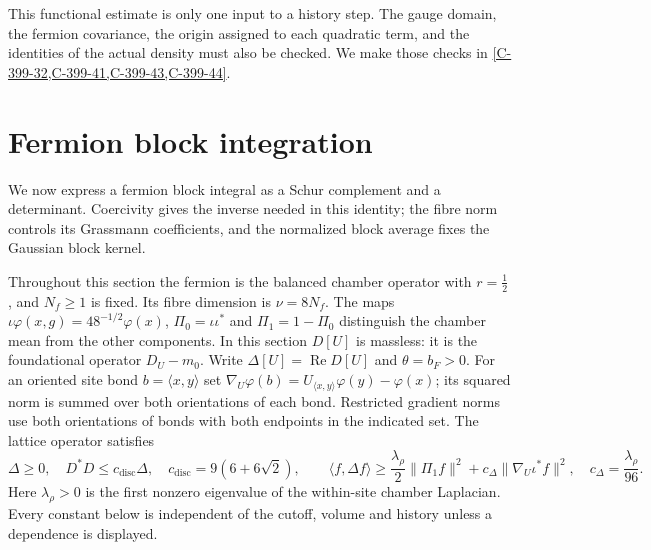 \documentclass[11pt,letterpaper,reqno]{amsart}
\theoremstyle{definition}
\theoremstyle{remark}
\begin{document}
This functional estimate is only one input to a history step.
The gauge domain, the fermion covariance, the origin assigned
to each quadratic term, and the identities of the actual density
must also be checked. We make those checks in
\cref{C-399-32,C-399-41,C-399-43,C-399-44}.

\section{Fermion block integration}

We now express a fermion block integral as a Schur complement
and a determinant. Coercivity gives the inverse needed in this
identity; the fibre norm controls its Grassmann coefficients,
and the normalized block average fixes the Gaussian block kernel.

Throughout this section the fermion is the balanced chamber operator
with $r=\frac12$, and $N_f\ge1$ is fixed.  Its fibre dimension is
$\nu=8N_f$.  The maps $\iota\varphi(x,g)=48^{-1/2}\varphi(x)$,
$\Pi_0=\iota\iota^*$ and $\Pi_1=1-\Pi_0$ distinguish the chamber mean
from the other components.  In this section $D[U]$ is massless:
it is the foundational operator $D_U-m_0$.
Write $\Delta[U]=\operatorname{Re}D[U]$ and $\theta=b_F>0$.
For an oriented site bond $b=\langle x,y\rangle$ set
$\nabla_U\varphi(b)=U_{\langle x,y\rangle}\varphi(y)-\varphi(x)$;
its squared norm is summed over both orientations of each bond.
Restricted gradient norms use both orientations of bonds with both
endpoints in the indicated set.
The lattice operator satisfies
\[
 \Delta\ge0,\quad D^*D\le c_{\mathrm{disc}}\Delta,
 \quad c_{\mathrm{disc}}=9(6+6\sqrt2),\qquad
 \langle f,\Delta f\rangle\ge
 \frac{\lambda_\rho}{2}\|\Pi_1f\|^2+
 c_\Delta\|\nabla_U\iota^*f\|^2,
 \quad c_\Delta=\frac{\lambda_\rho}{96}.
\]
Here $\lambda_\rho>0$ is the first nonzero eigenvalue of the
within-site chamber Laplacian.  Every constant below is independent
of the cutoff, volume and history unless a dependence is displayed.
\end{document}
